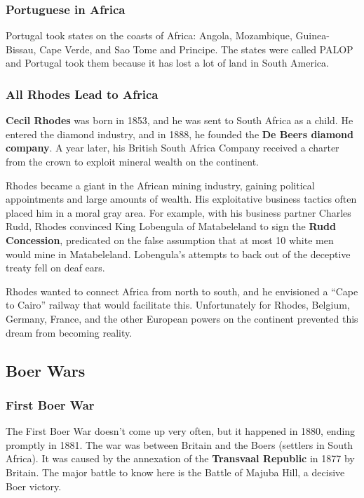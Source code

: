 \subsubsection*{Portuguese in Africa}

Portugal took states on the coasts of Africa:
Angola,
Mozambique,
Guinea-Bissau,
Cape Verde,
and Sao Tome and Principe.
The states were called PALOP and Portugal took them
because it has lost a lot of land in South America.

\subsubsection*{All Rhodes Lead to Africa}

\textbf{Cecil Rhodes} was born in 1853, and he was sent to South Africa as a child.
He entered the diamond industry, and in 1888,
he founded the \textbf{De Beers diamond company}.
A year later,
his British South Africa Company received a charter from the crown
to exploit mineral wealth on the continent.

Rhodes became a giant in the African mining industry,
gaining political appointments and large amounts of wealth.
His exploitative business tactics often placed him in a moral gray area.
For example, with his business partner Charles Rudd,
Rhodes convinced King Lobengula of Matabeleland to sign the \textbf{Rudd Concession},
predicated on the false assumption that at most 10 white men would mine in Matabeleland.
Lobengula's attempts to back out of the deceptive treaty fell on deaf ears.

Rhodes wanted to connect Africa from north to south,
and he envisioned a ``Cape to Cairo'' railway that would facilitate this.
Unfortunately for Rhodes, Belgium, Germany, France,
and the other European powers on the continent prevented this dream from becoming reality.

\subsection*{Boer Wars}

\subsubsection*{First Boer War}

The First Boer War doesn't come up very often, but it happened in 1880, ending promptly in 1881.
The war was between Britain and the Boers (settlers in South Africa).
It was caused by the annexation of the \textbf{Transvaal Republic} in 1877 by Britain.
The major battle to know here is the Battle of Majuba Hill, a decisive Boer victory.

